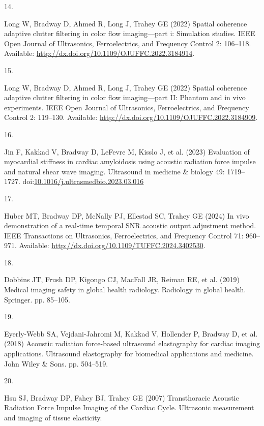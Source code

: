 \documentclass[
]{article}
\newlength{\cslhangindent}
\newlength{\csllabelwidth}
\newenvironment{CSLReferences}[2] %
 {\begin{list}{}{%
  \setlength{\itemindent}{0pt}
  \setlength{\leftmargin}{0pt}
  \setlength{\parsep}{0pt}
  \ifodd #1
   \setlength{\leftmargin}{\cslhangindent}
   \setlength{\itemindent}{-1\cslhangindent}
  \fi
  \setlength{\itemsep}{#2\baselineskip}}}
 {\end{list}}
\newcommand{\CSLLeftMargin}[1]{\parbox[t]{\csllabelwidth}{\strut#1\strut}}
\newcommand{\CSLRightInline}[1]{\parbox[t]{\linewidth - \csllabelwidth}{\strut#1\strut}}
\begin{document}
\begin{CSLReferences}{0}{1}
\CSLLeftMargin{14. }%
\CSLRightInline{Long W, Bradway D, Ahmed R, Long J, Trahey GE (2022)
Spatial coherence adaptive clutter filtering in color flow
imaging---part i: Simulation studies. IEEE Open Journal of Ultrasonics,
Ferroelectrics, and Frequency Control 2: 106--118. Available:
\url{http://dx.doi.org/10.1109/OJUFFC.2022.3184914}.}

\CSLLeftMargin{15. }%
\CSLRightInline{Long W, Bradway D, Ahmed R, Long J, Trahey GE (2022)
Spatial coherence adaptive clutter filtering in color flow
imaging---part II: Phantom and in vivo experiments. IEEE Open Journal of
Ultrasonics, Ferroelectrics, and Frequency Control 2: 119--130.
Available: \url{http://dx.doi.org/10.1109/OJUFFC.2022.3184909}.}

\CSLLeftMargin{16. }%
\CSLRightInline{Jin F, Kakkad V, Bradway D, LeFevre M, Kisslo J, et al.
(2023) Evaluation of myocardial stiffness in cardiac amyloidosis using
acoustic radiation force impulse and natural shear wave imaging.
Ultrasound in medicine \& biology 49: 1719--1727.
doi:\href{https://doi.org/10.1016/j.ultrasmedbio.2023.03.016}{10.1016/j.ultrasmedbio.2023.03.016}}

\CSLLeftMargin{17. }%
\CSLRightInline{Huber MT, Bradway DP, McNally PJ, Ellestad SC, Trahey GE
(2024) In vivo demonstration of a real-time temporal SNR acoustic output
adjustment method. IEEE Transactions on Ultrasonics, Ferroelectrics, and
Frequency Control 71: 960--971. Available:
\url{http://dx.doi.org/10.1109/TUFFC.2024.3402530}.}

\CSLLeftMargin{18. }%
\CSLRightInline{Dobbins JT, Frush DP, Kigongo CJ, MacFall JR, Reiman RE,
et al. (2019) Medical imaging safety in global health radiology.
Radiology in global health. Springer. pp. 85--105.}

\CSLLeftMargin{19. }%
\CSLRightInline{Eyerly-Webb SA, Vejdani-Jahromi M, Kakkad V, Hollender
P, Bradway D, et al. (2018) Acoustic radiation force-based ultrasound
elastography for cardiac imaging applications. Ultrasound elastography
for biomedical applications and medicine. John Wiley \& Sons. pp.
504--519.}

\CSLLeftMargin{20. }%
\CSLRightInline{Hsu SJ, Bradway DP, Fahey BJ, Trahey GE (2007)
{Transthoracic Acoustic Radiation Force Impulse Imaging of the Cardiac
Cycle}. Ultrasonic measurement and imaging of tissue elasticity.}


\end{CSLReferences}
\end{document}
